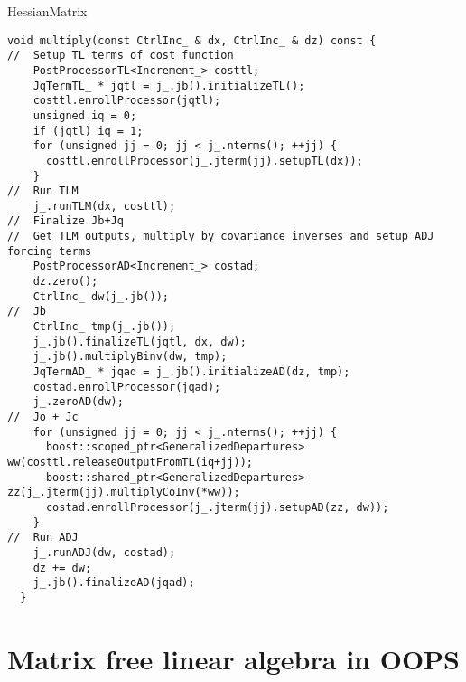\documentclass[9pt]{beamer}
\begin{document}
\begin{frame}[fragile]{HessianMatrix}
  \begin{lstlisting}[basicstyle=\ttfamily\tiny]
    void multiply(const CtrlInc_ & dx, CtrlInc_ & dz) const {
//  Setup TL terms of cost function
    PostProcessorTL<Increment_> costtl;
    JqTermTL_ * jqtl = j_.jb().initializeTL();
    costtl.enrollProcessor(jqtl);
    unsigned iq = 0;
    if (jqtl) iq = 1;
    for (unsigned jj = 0; jj < j_.nterms(); ++jj) {
      costtl.enrollProcessor(j_.jterm(jj).setupTL(dx));
    }
//  Run TLM
    j_.runTLM(dx, costtl);
//  Finalize Jb+Jq
//  Get TLM outputs, multiply by covariance inverses and setup ADJ forcing terms
    PostProcessorAD<Increment_> costad;
    dz.zero();
    CtrlInc_ dw(j_.jb());
//  Jb
    CtrlInc_ tmp(j_.jb());
    j_.jb().finalizeTL(jqtl, dx, dw);
    j_.jb().multiplyBinv(dw, tmp);
    JqTermAD_ * jqad = j_.jb().initializeAD(dz, tmp);
    costad.enrollProcessor(jqad);
    j_.zeroAD(dw);
//  Jo + Jc
    for (unsigned jj = 0; jj < j_.nterms(); ++jj) {
      boost::scoped_ptr<GeneralizedDepartures> ww(costtl.releaseOutputFromTL(iq+jj));
      boost::shared_ptr<GeneralizedDepartures> zz(j_.jterm(jj).multiplyCoInv(*ww));
      costad.enrollProcessor(j_.jterm(jj).setupAD(zz, dw));
    }
//  Run ADJ
    j_.runADJ(dw, costad);
    dz += dw;
    j_.jb().finalizeAD(jqad);
  }
\end{lstlisting}
\end{frame}





%
\section{Matrix free linear algebra in OOPS}
\end{document}
